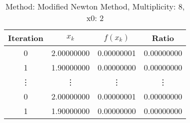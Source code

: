 \begin{table}
\centering
\caption{Method: Modified Newton Method, Multiplicity: 8, x0: 2}
\label{tab:table_Modified_Newton_Method_8_2}
\begin{tabular}{c c c c}
\toprule
Iteration &      $x_k$ &   $f(x_k)$ &      Ratio \\
\midrule
        0 & 2.00000000 & 0.00000001 & 0.00000000 \\
        1 & 1.90000000 & 0.00000000 & 0.00000000 \\
   \vdots &     \vdots &     \vdots &     \vdots \\
        0 & 2.00000000 & 0.00000001 & 0.00000000 \\
        1 & 1.90000000 & 0.00000000 & 0.00000000 \\
\bottomrule
\end{tabular}
\end{table}

